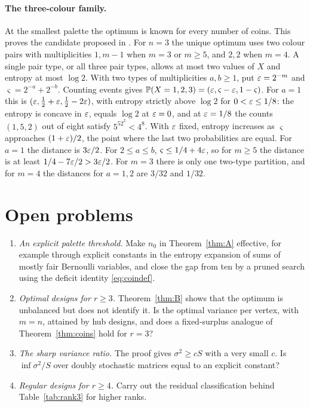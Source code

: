 \documentclass[11pt,a4paper]{article}
\theoremstyle{definition}\newtheorem{remark}[theorem]{Remark}\newtheorem{conjecture}{Conjecture}
\begin{document}
\paragraph{The three-colour family.} At the smallest palette the optimum is known for every number of coins. This proves the candidate proposed in \cite{tt}. For $n=3$ the unique optimum uses two colour pairs with multiplicities $1,m-1$ when $m=3$ or $m\ge5$, and $2,2$ when $m=4$. A single pair type, or all three pair types, allows at most two values of $X$ and entropy at most $\log2$. With two types of multiplicities $a,b\ge1$, put $\varepsilon=2^{-m}$ and $\varsigma=2^{-a}+2^{-b}$. Counting events gives $\mathbb P(X=1,2,3)=(\varepsilon,\varsigma-\varepsilon,1-\varsigma)$. For $a=1$ this is $(\varepsilon,\tfrac12+\varepsilon,\tfrac12-2\varepsilon)$, with entropy strictly above $\log2$ for $0<\varepsilon\le1/8$: the entropy is concave in $\varepsilon$, equals $\log2$ at $\varepsilon=0$, and at $\varepsilon=1/8$ the counts $(1,5,2)$ out of eight satisfy $5^52^2<4^8$. With $\varepsilon$ fixed, entropy increases as $\varsigma$ approaches $(1+\varepsilon)/2$, the point where the last two probabilities are equal. For $a=1$ the distance is $3\varepsilon/2$. For $2\le a\le b$, $\varsigma\le1/4+4\varepsilon$, so for $m\ge5$ the distance is at least $1/4-7\varepsilon/2>3\varepsilon/2$. For $m=3$ there is only one two-type partition, and for $m=4$ the distances for $a=1,2$ are $3/32$ and $1/32$.

\section{Open problems}\label{sec:open}
\begin{enumerate}
\item \emph{An explicit palette threshold.} Make $n_0$ in Theorem~\ref{thm:A} effective, for example through explicit constants in the entropy expansion of sums of mostly fair Bernoulli variables, and close the gap from ten by a pruned search using the deficit identity \eqref{eq:coindef}.
\item \emph{Optimal designs for $r\ge3$.} Theorem~\ref{thm:B} shows that the optimum is unbalanced but does not identify it. Is the optimal variance per vertex, with $m=n$, attained by hub designs, and does a fixed-surplus analogue of Theorem~\ref{thm:coins} hold for $r=3$?
\item \emph{The sharp variance ratio.} The proof gives $\sigma^2\ge cS$ with a very small $c$. Is $\inf\sigma^2/S$ over doubly stochastic matrices equal to an explicit constant?
\item \emph{Regular designs for $r\ge4$.} Carry out the residual classification behind Table~\ref{tab:rank3} for higher ranks.
\end{enumerate}
\end{document}
